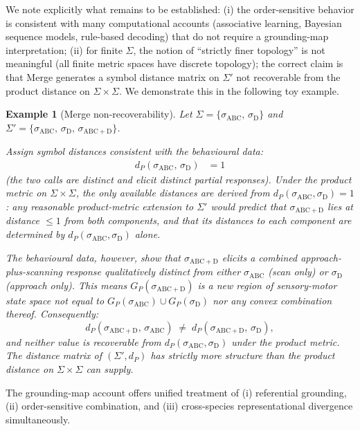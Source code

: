 \documentclass[12pt]{article}
\newtheorem{example}{Example}
\begin{document}
We note explicitly what remains to be established:
(i) the order-sensitive behavior is consistent with
many computational accounts (associative learning,
Bayesian sequence models, rule-based decoding)
that do not require a grounding-map interpretation;
(ii) for finite $\Sigma$, the notion of ``strictly finer topology''
is not meaningful (all finite metric spaces have discrete topology);
the correct claim is that Merge generates a symbol distance matrix
on $\Sigma'$ not recoverable from the product distance on $\Sigma \times \Sigma$.
We demonstrate this in the following toy example.

\begin{example}[Merge non-recoverability]
\label{ex:merge}
Let $\Sigma = \{\sigma_\mathrm{ABC},\, \sigma_\mathrm{D}\}$
and $\Sigma' = \{\sigma_\mathrm{ABC},\, \sigma_\mathrm{D},\, \sigma_\mathrm{ABC+D}\}$.

Assign symbol distances consistent with the behavioural data:
\begin{align*}
d_P(\sigma_\mathrm{ABC},\, \sigma_\mathrm{D}) &= 1
\end{align*}
(the two calls are distinct and elicit distinct partial responses).
Under the product metric on $\Sigma \times \Sigma$,
the only available distances are derived from $d_P(\sigma_\mathrm{ABC}, \sigma_\mathrm{D}) = 1$:
any reasonable product-metric extension to $\Sigma'$ would predict
that $\sigma_\mathrm{ABC+D}$ lies at distance $\leq 1$ from both components,
and that its distances to each component are determined by
$d_P(\sigma_\mathrm{ABC}, \sigma_\mathrm{D})$ alone.

The behavioural data, however, show that $\sigma_\mathrm{ABC+D}$ elicits
a combined approach-plus-scanning response qualitatively distinct from
either $\sigma_\mathrm{ABC}$ (scan only) or $\sigma_\mathrm{D}$ (approach only).
This means $G_P(\sigma_\mathrm{ABC+D})$ is a new region of sensory-motor
state space not equal to $G_P(\sigma_\mathrm{ABC}) \cup G_P(\sigma_\mathrm{D})$
nor any convex combination thereof.
Consequently:
\[
d_P(\sigma_\mathrm{ABC+D},\, \sigma_\mathrm{ABC})
\;\neq\; d_P(\sigma_\mathrm{ABC+D},\, \sigma_\mathrm{D}),
\]
and neither value is recoverable from $d_P(\sigma_\mathrm{ABC}, \sigma_\mathrm{D})$
under the product metric.
The distance matrix of $(\Sigma', d_P)$ has strictly more structure
than the product distance on $\Sigma \times \Sigma$ can supply.
\end{example}

The grounding-map account offers unified treatment of
(i) referential grounding, (ii) order-sensitive combination, and
(iii) cross-species representational divergence simultaneously.
\end{document}
